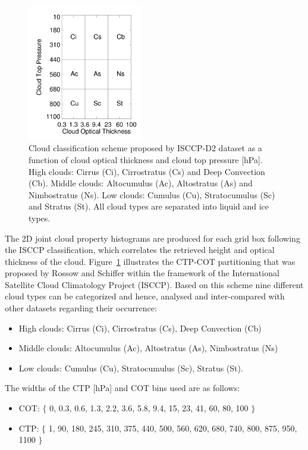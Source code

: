 \begin{figure}[!ht]
  \begin{minipage}{0.4\textwidth}
    \includegraphics[width=5cm,height=6cm]{./figures/isccp_uebersicht.png} 
  \end{minipage}
  \begin{minipage}{0.6\textwidth}
    \caption[ISCCP COT-CTP classification.]
    {Cloud classification scheme proposed by ISCCP-D2 dataset
    as a function of cloud optical thickness and cloud top pressure [hPa].
    High clouds: Cirrus (Ci), Cirrostratus (Cs) and Deep Convection (Cb).
    Middle clouds: Altocumulus (Ac), Altostratus (As) and Nimbostratus (Ns).
    Low clouds: Cumulus (Cu), Stratocumulus (Sc) and Stratus (St).
    All cloud types are separated into liquid and ice types.}
    \label{fig:isccp}
  \end{minipage}
\end{figure}


The 2D joint cloud property histograms are produced for each grid box following 
the ISCCP classification, which correlates the retrieved height and optical thickness of the cloud. 
Figure~\ref{fig:isccp} illustrates the CTP-COT partitioning that was proposed 
by Rossow and Schiffer \cite{Rossow1999} within the framework of the 
International Satellite Cloud Climatology Project (ISCCP).
Based on this scheme nine different cloud types can be categorized and hence,
analysed and inter-compared with other datasets regarding their occurrence:
\begin{itemize}\setlength\itemsep{0.2em}
 \item High clouds: Cirrus (Ci), Cirrostratus (Cs), Deep Convection (Cb)
 \item Middle clouds: Altocumulus (Ac), Altostratus (As), Nimbostratus (Ns)
 \item Low clouds: Cumulus (Cu), Stratocumulus (Sc), Stratus (St).
\end{itemize}
The widths of the CTP [hPa] and COT bins used are as follows:
\begin{itemize}\setlength\itemsep{0.2em}
 \item COT: $\{$ 0, 0.3, 0.6, 1.3, 2.2, 3.6, 5.8, 9.4, 15, 23, 41, 60, 80, 100 $\}$
 \item CTP: $\{$ 1, 90, 180, 245, 310, 375, 440, 500, 560, 620, 680, 740, 800, 875, 950, 1100 $\}$
\end{itemize}

